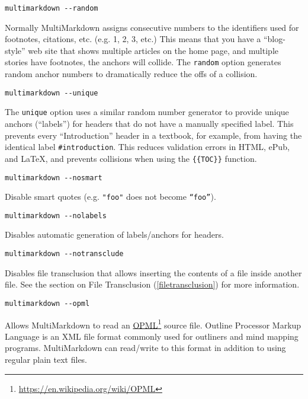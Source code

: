 \begin{verbatim}
multimarkdown --random
\end{verbatim}

Normally MultiMarkdown assigns consecutive numbers to the identifiers used for footnotes, citations, etc. (e.g. 1, 2, 3, etc.) This means that you have a ``blog-style'' web site that shows multiple articles on the home page, and multiple stories have footnotes, the anchors will collide. The \texttt{random} option generates random anchor numbers to dramatically reduce the offs of a collision.

\begin{verbatim}
multimarkdown --unique
\end{verbatim}

The \texttt{unique} option uses a similar random number generator to provide unique anchors (``labels'') for headers that do not have a manually specified label. This prevents every ``Introduction'' header in a textbook, for example, from having the identical label \texttt{\#introduction}. This reduces validation errors in HTML, ePub, and LaTeX, and prevents collisions when using the \texttt{\{\{TOC\}\}} function.

\begin{verbatim}
multimarkdown --nosmart
\end{verbatim}

Disable smart quotes (e.g. \texttt{"foo"} does not become \texttt{“foo”}).

\begin{verbatim}
multimarkdown --nolabels
\end{verbatim}

Disables automatic generation of labels\slash{}anchors for headers.

\begin{verbatim}
multimarkdown --notransclude
\end{verbatim}

Disables file transclusion that allows inserting the contents of a file inside another file. See the section on File Transclusion (\autoref{filetransclusion}) for more information.

\begin{verbatim}
multimarkdown --opml
\end{verbatim}

Allows MultiMarkdown to read an \href{https://en.wikipedia.org/wiki/OPML}{OPML}\footnote{\href{https://en.wikipedia.org/wiki/OPML}{https:\slash{}\slash{}en.wikipedia.org\slash{}wiki\slash{}OPML}} source file. Outline Processor Markup Language is an XML file format commonly used for outliners and mind mapping programs. MultiMarkdown can read\slash{}write to this format in addition to using regular plain text files.

